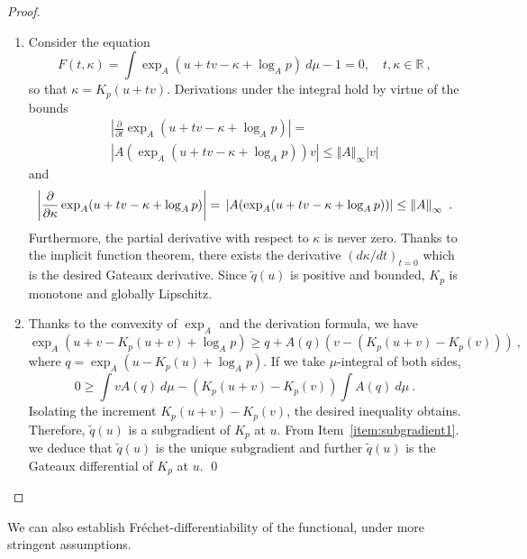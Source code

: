 \documentclass[graybox]{svmult}
\begin{document}
\begin{proof}
\begin{enumerate}
\item Consider the equation 
\begin{equation*}
F(t,\kappa )=\int \exp _{A}(u+tv-\kappa +\log _{A}p)\ d\mu -1=0,\quad t,\kappa
\in \mathbb{R} \ ,
\end{equation*}
so that $\kappa = K_p(u+tv)$.  Derivations under the integral hold by virtue of the bounds 
\begin{multline*}
\left\vert \frac{\partial }{\partial t}\exp _{A}(u+tv-\kappa +\log
_{A}p)\right\vert = \\
\left\vert A(\exp _{A}(u+tv-\kappa +\log _{A}p))v\right\vert \leq \left\Vert
A\right\Vert _{\infty }\left\vert v\right\vert
\end{multline*}
and 
\begin{equation*}
\left\vert \frac{\partial }{\partial \kappa }\exp _{A}(u+tv-\kappa +\log
_{A}p)\right\vert = \\
\left\vert A(\exp _{A}(u+tv-\kappa +\log _{A}p))\right\vert \leq \left\Vert
A\right\Vert _{\infty }\ .
\end{equation*}
Furthermore, the partial derivative with respect to $\kappa$ is never zero. Thanks to the implicit function theorem, there exists the derivative $\left( d\kappa /dt\right) _{t=0}$
which is the desired Gateaux derivative. Since $\widetilde q(u)$ is positive and bounded, $K_p$ is monotone and globally Lipschitz.
%
\item Thanks to the convexity of $\exp _{A}$ and the derivation formula, we
have 
\begin{equation*}
\exp _{A}(u+v-K_{p}(u+v)+\log _{A}p)\geq q+A(q)(v-(K_{p}(u+v)-K_{p}(v)))\ ,
\end{equation*}
where $q = \exp_A(u - K_p(u) + \log_A p)$.
If we take $\mu $-integral of both sides, 
\begin{equation*}
0\geq \int vA(q)\ d\mu -(K_{p}(u+v)-K_{p}(v))\int A(q)\ d\mu \ .
\end{equation*}
Isolating the increment $K_{p}(u+v)-K_{p}(v)$, the desired inequality
obtains. Therefore, $\widetilde{q}(u)$ is a subgradient of $K_{p}$ at $u$.
From Item~\ref{item:subgradient1}. we deduce that $\widetilde{q}(u)$ is the unique subgradient and further $\widetilde{q}(u)$ is the Gateaux differential of $K_{p}$ at $u$. \qed
\end{enumerate}
\end{proof}

We can also establish Fr\'echet-differentiability of the functional, under more stringent assumptions.
\end{document}
